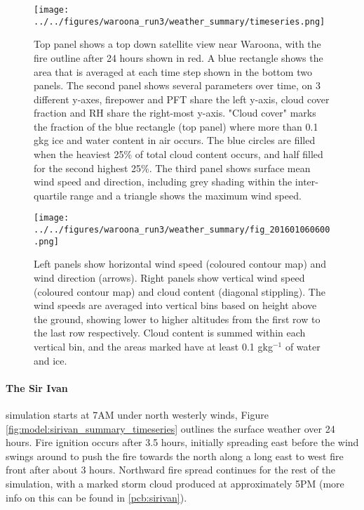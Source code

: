     \begin{figure}
      \texttt{[image: ../../figures/waroona\_run3/weather\_summary/timeseries.png]}
      \caption{%
        Top panel shows a top down satellite view near Waroona, with the fire outline after 24 hours shown in red. A blue rectangle shows the area that is averaged at each time step shown in the bottom two panels.
        The second panel shows several parameters over time, on 3 different y-axes, firepower and PFT share the left y-axis, cloud cover fraction and RH share the right-most y-axis.
        "Cloud cover" marks the fraction of the blue rectangle (top panel) where more than 0.1 g\/kg ice and water content in air occurs. 
        The blue circles are filled when the heaviest 25\% of total cloud content occurs, and half filled for the second highest 25\%.
        The third panel shows surface mean wind speed and direction, including grey shading within the inter-quartile range and a triangle shows the maximum wind speed.
        }
      \label{fig:model:waroona_summary_timeseries}
    \end{figure}
    
    \begin{figure}
      \texttt{[image: ../../figures/waroona\_run3/weather\_summary/fig\_201601060600.png]}
      \caption{Left panels show horizontal wind speed (coloured contour map) and wind direction (arrows).
      Right panels show vertical wind speed (coloured contour map) and cloud content (diagonal stippling).
      The wind speeds are averaged into vertical bins based on height above the ground, showing lower to higher altitudes from the first row to the last row respectively.
      Cloud content is summed within each vertical bin, and the areas marked have at least 0.1 gkg$^{-1}$ of water and ice.}
      \label{fig:model:weather_summary_updraught}
    \end{figure}
    
    \paragraph{The Sir Ivan} simulation starts at 7AM under north westerly winds, Figure \ref{fig:model:sirivan_summary_timeseries} outlines the surface weather over 24 hours.
    Fire ignition occurs after 3.5 hours, initially spreading east before the wind swings around to push the fire towards the north along a long east to west fire front after about 3 hours. 
    Northward fire spread continues for the rest of the simulation, with a marked storm cloud produced at approximately 5PM (more info on this can be found in \ref{pcb:sirivan}).
    
